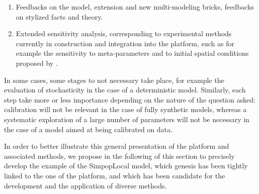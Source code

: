 \documentclass[10pt]{article}
\begin{document}
\begin{enumerate}
	\item Feedbacks on the model, extension and new multi-modeling bricks, feedbacks on stylized facts and theory.
	\item Extended sensitivity analysis, corresponding to experimental methods currently in construction and integration into the platform, such as for example the sensitivity to meta-parameters and to initial spatial conditions proposed by \cite{raimbault2018space}.
\end{enumerate}

In some cases, some stages to not necessary take place, for example the evaluation of stochasticity in the case of a deterministic model. Similarly, each step take more or less importance depending on the nature of the question asked: calibration will not be relevant in the case of fully synthetic models, whereas a systematic exploration of a large number of parameters will not be necessary in the case of a model aimed at being calibrated on data.

In order to better illustrate this general presentation of the platform and associated methods, we propose in the following of this section to precisely develop the example of the SimpopLocal model, which genesis has been tightly linked to the one of the platform, and which has been candidate for the development and the application of diverse methods.


\end{document}
